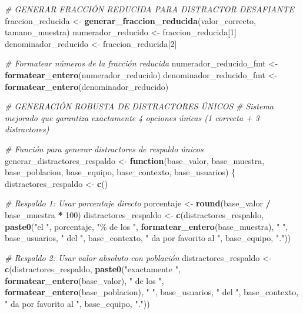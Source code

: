 \documentclass[
]{article}
\newenvironment{Shaded}{\begin{snugshade}}{\end{snugshade}}
\newcommand{\CommentTok}[1]{\textcolor[rgb]{0.56,0.35,0.01}{\textit{#1}}}
\newcommand{\ControlFlowTok}[1]{\textcolor[rgb]{0.13,0.29,0.53}{\textbf{#1}}}
\newcommand{\DecValTok}[1]{\textcolor[rgb]{0.00,0.00,0.81}{#1}}
\newcommand{\FunctionTok}[1]{\textcolor[rgb]{0.13,0.29,0.53}{\textbf{#1}}}
\newcommand{\NormalTok}[1]{#1}
\newcommand{\OtherTok}[1]{\textcolor[rgb]{0.56,0.35,0.01}{#1}}
\newcommand{\SpecialCharTok}[1]{\textcolor[rgb]{0.81,0.36,0.00}{\textbf{#1}}}
\newcommand{\StringTok}[1]{\textcolor[rgb]{0.31,0.60,0.02}{#1}}
\begin{document}
\begin{Shaded}
\begin{Highlighting}[]
\CommentTok{\# GENERAR FRACCIÓN REDUCIDA PARA DISTRACTOR DESAFIANTE}
\NormalTok{fraccion\_reducida }\OtherTok{\textless{}{-}} \FunctionTok{generar\_fraccion\_reducida}\NormalTok{(valor\_correcto, tamano\_muestra)}
\NormalTok{numerador\_reducido }\OtherTok{\textless{}{-}}\NormalTok{ fraccion\_reducida[}\DecValTok{1}\NormalTok{]}
\NormalTok{denominador\_reducido }\OtherTok{\textless{}{-}}\NormalTok{ fraccion\_reducida[}\DecValTok{2}\NormalTok{]}

\CommentTok{\# Formatear números de la fracción reducida}
\NormalTok{numerador\_reducido\_fmt }\OtherTok{\textless{}{-}} \FunctionTok{formatear\_entero}\NormalTok{(numerador\_reducido)}
\NormalTok{denominador\_reducido\_fmt }\OtherTok{\textless{}{-}} \FunctionTok{formatear\_entero}\NormalTok{(denominador\_reducido)}

\CommentTok{\# GENERACIÓN ROBUSTA DE DISTRACTORES ÚNICOS}
\CommentTok{\# Sistema mejorado que garantiza exactamente 4 opciones únicas (1 correcta + 3 distractores)}

\CommentTok{\# Función para generar distractores de respaldo únicos}
\NormalTok{generar\_distractores\_respaldo }\OtherTok{\textless{}{-}} \ControlFlowTok{function}\NormalTok{(base\_valor, base\_muestra, base\_poblacion, base\_equipo, base\_contexto, base\_usuarios) \{}
\NormalTok{  distractores\_respaldo }\OtherTok{\textless{}{-}} \FunctionTok{c}\NormalTok{()}

  \CommentTok{\# Respaldo 1: Usar porcentaje directo}
\NormalTok{  porcentaje }\OtherTok{\textless{}{-}} \FunctionTok{round}\NormalTok{(base\_valor }\SpecialCharTok{/}\NormalTok{ base\_muestra }\SpecialCharTok{*} \DecValTok{100}\NormalTok{)}
\NormalTok{  distractores\_respaldo }\OtherTok{\textless{}{-}} \FunctionTok{c}\NormalTok{(distractores\_respaldo,}
    \FunctionTok{paste0}\NormalTok{(}\StringTok{"el "}\NormalTok{, porcentaje, }\StringTok{"\% de los "}\NormalTok{, }\FunctionTok{formatear\_entero}\NormalTok{(base\_muestra), }\StringTok{" "}\NormalTok{, base\_usuarios,}
           \StringTok{" del "}\NormalTok{, base\_contexto, }\StringTok{" da por favorito al "}\NormalTok{, base\_equipo, }\StringTok{"."}\NormalTok{))}

  \CommentTok{\# Respaldo 2: Usar valor absoluto con población}
\NormalTok{  distractores\_respaldo }\OtherTok{\textless{}{-}} \FunctionTok{c}\NormalTok{(distractores\_respaldo,}
    \FunctionTok{paste0}\NormalTok{(}\StringTok{"exactamente "}\NormalTok{, }\FunctionTok{formatear\_entero}\NormalTok{(base\_valor), }\StringTok{" de los "}\NormalTok{, }\FunctionTok{formatear\_entero}\NormalTok{(base\_poblacion), }\StringTok{" "}\NormalTok{,}
\NormalTok{           base\_usuarios, }\StringTok{" del "}\NormalTok{, base\_contexto, }\StringTok{" da por favorito al "}\NormalTok{, base\_equipo, }\StringTok{"."}\NormalTok{))}


\end{Highlighting}
\end{Shaded}
\end{document}
